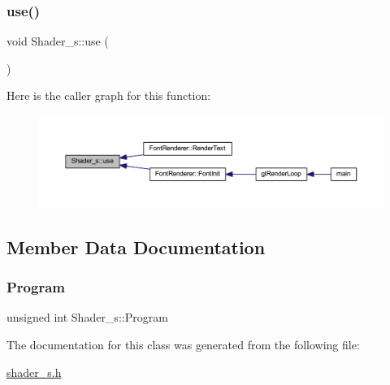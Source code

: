 \mbox{\label{class_shader__s_ab9a0962e895e47de837d2d42279b6007}} 
\subsubsection{\texorpdfstring{use()}{use()}}
{\footnotesize\ttfamily void Shader\+\_\+s\+::use (\begin{DoxyParamCaption}{ }\end{DoxyParamCaption})\hspace{0.3cm}{\ttfamily [inline]}}

Here is the caller graph for this function\+:
\nopagebreak
\begin{figure}[H]
\begin{center}
\leavevmode
\includegraphics[width=350pt]{class_shader__s_ab9a0962e895e47de837d2d42279b6007_icgraph}
\end{center}
\end{figure}


\subsection{Member Data Documentation}
\mbox{\label{class_shader__s_a56ceb9f16ece43969110b5b23eb31956}} 
\subsubsection{\texorpdfstring{Program}{Program}}
{\footnotesize\ttfamily unsigned int Shader\+\_\+s\+::\+Program}



The documentation for this class was generated from the following file\+:\begin{DoxyCompactItemize}
\item 
\mbox{\hyperlink{shader__s_8h}{shader\+\_\+s.\+h}}\end{DoxyCompactItemize}
